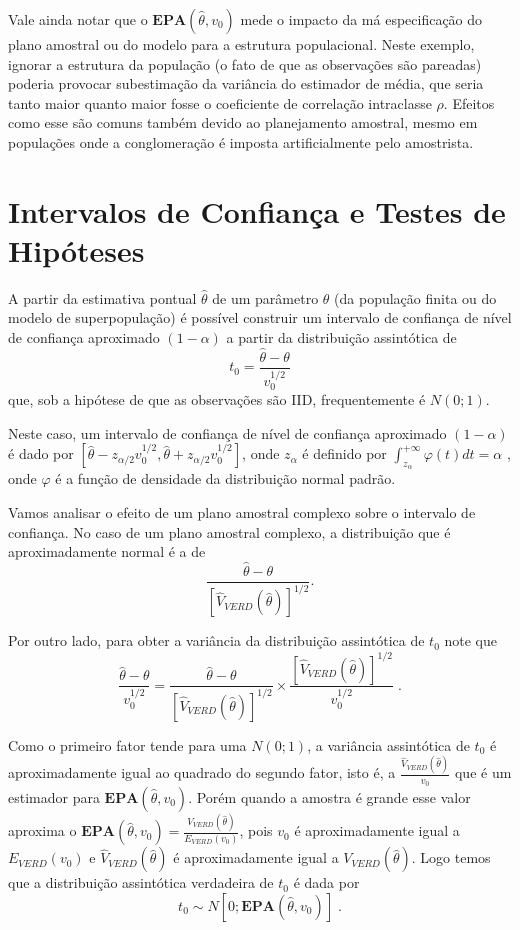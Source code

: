 \documentclass[]{book}
\theoremstyle{definition}
\theoremstyle{definition}
\theoremstyle{definition}
\theoremstyle{remark}
\begin{document}
Vale ainda notar que o \(\mathbf{EPA}\left( \hat{\theta},v_{0}\right)\)
mede o impacto da má especificação do plano amostral ou do modelo para a
estrutura populacional. Neste exemplo, ignorar a estrutura da população
(o fato de que as observações são pareadas) poderia provocar
subestimação da variância do estimador de média, que seria tanto maior
quanto maior fosse o coeficiente de correlação intraclasse \(\rho\).
Efeitos como esse são comuns também devido ao planejamento amostral,
mesmo em populações onde a conglomeração é imposta artificialmente pelo
amostrista.

\section{Intervalos de Confiança e Testes de Hipóteses}\label{icth}

A partir da estimativa pontual \(\hat{\theta}\) de um parâmetro
\(\theta\) (da população finita ou do modelo de superpopulação) é
possível construir um intervalo de confiança de nível de confiança
aproximado \(\left( 1-\alpha \right)\) a partir da distribuição
assintótica de \[
t_{0}=\frac{\hat{\theta}-\theta }{v_{0}^{1/2}} 
\] que, sob a hipótese de que as observações são IID, frequentemente é
\(N\left( 0;1\right)\).

Neste caso, um intervalo de confiança de nível de confiança aproximado
\(\left( 1-\alpha \right)\) é dado por
\(\left[ \hat{\theta}-z_{\alpha /2}v_{0}^{1/2},\hat{\theta}+z_{\alpha /2}v_{0}^{1/2}\right]\),
onde \(z_{\alpha }\) é definido por
\(\int_{z_{\alpha }}^{+\infty }\varphi\left( t\right) dt=\alpha\) , onde
\(\varphi\) é a função de densidade da distribuição normal padrão.

Vamos analisar o efeito de um plano amostral complexo sobre o intervalo
de confiança. No caso de um plano amostral complexo, a distribuição que
é aproximadamente normal é a de \[
\frac{\hat{\theta}-\theta }{\left[ \widehat{V}_{VERD}\left( \hat{\theta}\right) \right] ^{1/2}}. 
\]

Por outro lado, para obter a variância da distribuição assintótica de
\(t_{0}\) note que \[
\frac{\hat{\theta}-\theta }{v_{0}^{1/2}}=\frac{\hat{\theta}-\theta }{\left[ 
\widehat{V}_{VERD}\left( \hat{\theta}\right) \right] ^{1/2}}\times \frac{
\left[ \widehat{V}_{VERD}\left( \hat{\theta}\right) \right] ^{1/2}}{
v_{0}^{1/2}}\;. 
\]

Como o primeiro fator tende para uma \(N\left( 0;1\right)\), a variância
assintótica de \(t_{0}\) é aproximadamente igual ao quadrado do segundo
fator, isto é, a
\(\frac{\widehat{V}_{VERD}\left( \hat{\theta}\right) }{v_{0}}\) que é um
estimador para \(\mathbf{EPA}\left( \hat{\theta},v_{0}\right)\). Porém
quando a amostra é grande esse valor aproxima o
\(\mathbf{EPA}\left( \hat{\theta},v_{0}\right) =\frac{V_{VERD}\left( \hat{\theta}\right) }{E_{VERD}\left( v_{0}\right) }\),
pois \(v_{0}\) é aproximadamente igual a \(E_{VERD}\left( v_{0}\right)\)
e \(\widehat{V}_{VERD}\left( \hat{\theta}\right)\) é aproximadamente
igual a \(V_{VERD}\left( \hat{\theta}\right)\). Logo temos que a
distribuição assintótica verdadeira de \(t_{0}\) é dada por \[
t_{0}\sim N\left[ 0;\mathbf{EPA}\left( \hat{\theta},v_{0}\right)
\right] \;. 
\]
\end{document}
